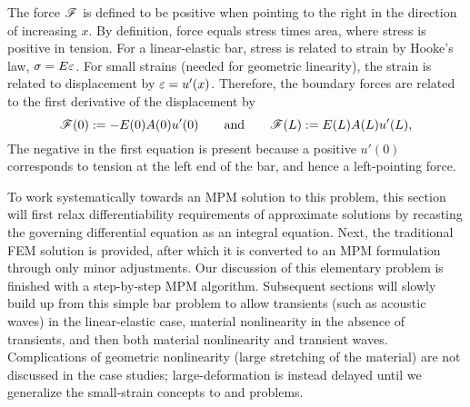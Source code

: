 %
The force $\mathscr{F}$ is defined to be positive when pointing to the right in the direction of increasing $x$. By definition, force equals stress times area, where stress is positive in tension. For a linear-elastic bar, stress \sig is related to strain \eps by Hooke's law, ${\sigma}=E {\varepsilon}$. For small strains (needed for geometric linearity), the strain is related to displacement by ${\varepsilon}=u'(x)$. Therefore, the boundary forces are related to the first derivative of the displacement by
\begin{equation}
  \mathscr{F}(0):= -E(0)A(0)u'(0)
\qquad\text{and}\qquad
  \mathscr{F}(L):=  E(L)A(L)u'(L),
\label{eq:boundaryForces}
\end{equation}
The negative in the first equation is present because a positive $u'(0)$ corresponds to tension at the left end of the bar, and hence a left-pointing force.
%


To work systematically towards an MPM solution to this problem, this section will first relax differentiability requirements of approximate solutions by recasting the governing differential equation as an integral equation. Next, the traditional FEM solution is provided, after which it is converted to an MPM formulation through only minor adjustments. Our discussion of this elementary problem is finished with a step-by-step MPM algorithm.  Subsequent sections will slowly build up from this simple \oneD bar problem to allow transients (such as acoustic waves) in the linear-elastic case, material nonlinearity in the absence of transients, and then both material nonlinearity and transient waves. Complications of geometric nonlinearity (\ie large stretching of the material) are not discussed in the \oneD case studies; large-deformation is instead delayed until we generalize the small-strain concepts to \twoD and \threeD problems.


